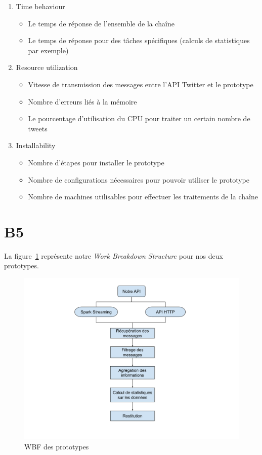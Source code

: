   \begin{enumerate}
    \item Time behaviour
      \begin{itemize}
        \item Le temps de réponse de l'ensemble de la chaîne
        \item Le temps de réponse pour des tâches spécifiques (calculs de statistiques par exemple)
      \end{itemize} \bigskip

    \item Resource utilization
      \begin{itemize}
        \item Vitesse de transmission des messages entre l'API Twitter et le prototype
        \item Nombre d'erreurs liés à la mémoire
        \item Le pourcentage d'utilisation du CPU pour traiter un certain nombre de tweets
      \end{itemize} \bigskip

    \item Installability
      \begin{itemize}
        \item Nombre d'étapes pour installer le prototype
        \item Nombre de configurations nécessaires pour pouvoir utiliser le prototype
        \item Nombre de machines utilisables pour effectuer les traitements de la chaîne
      \end{itemize} \bigskip
  \end{enumerate}


\section{B5}
\label{sec:B5}
  La figure~\ref{WBS} représente notre \emph{Work Breakdown Structure} pour nos deux prototypes.

  \begin{figure}
    \centering
    \includegraphics[width=1\textwidth]{images/WBS.pdf}
    \caption{WBF des prototypes}
    \label{WBS}
  \end{figure}
